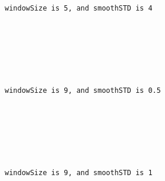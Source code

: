 \documentclass[11pt]{article}
\begin{document}
    \begin{Verbatim}[commandchars=\\\{\}]


windowSize is 5, and smoothSTD is 4

    \end{Verbatim}

    \begin{center}
    \end{center}
    { \hspace*{\fill} \\}
    
    \begin{center}
    \end{center}
    { \hspace*{\fill} \\}
    
    \begin{Verbatim}[commandchars=\\\{\}]


windowSize is 9, and smoothSTD is 0.5

    \end{Verbatim}

    \begin{center}
    \end{center}
    { \hspace*{\fill} \\}
    
    \begin{center}
    \end{center}
    { \hspace*{\fill} \\}
    
    \begin{Verbatim}[commandchars=\\\{\}]


windowSize is 9, and smoothSTD is 1

    \end{Verbatim}

    \begin{center}
    \end{center}
    { \hspace*{\fill} \\}
    
\end{document}
